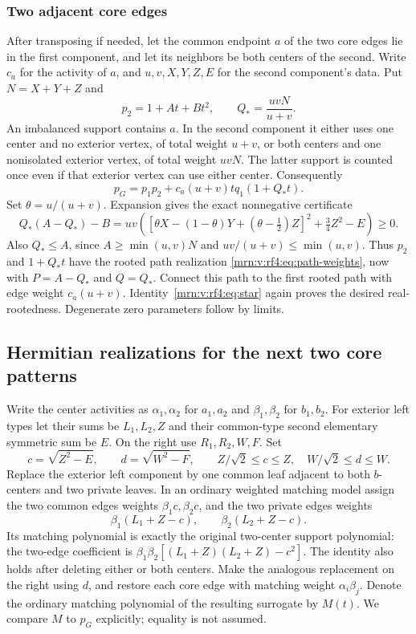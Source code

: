 \documentclass[11pt,a4paper]{article}
\theoremstyle{remark}\newtheorem{remark}[theorem]{Remark}
\begin{document}
\subsubsection{Two adjacent core edges}
After transposing if needed, let the common endpoint $a$ of the two core edges lie in the first component, and let its neighbors be both centers of the second. Write $c_a$ for the activity of $a$, and $u,v,X,Y,Z,E$ for the second component's data. Put $N=X+Y+Z$ and
\[
p_2=1+At+Bt^2,\qquad Q_* =\frac{uvN}{u+v}.
\]
An imbalanced support contains $a$. In the second component it either uses one center and no exterior vertex, of total weight $u+v$, or both centers and one nonisolated exterior vertex, of total weight $uvN$. The latter support is counted once even if that exterior vertex can use either center. Consequently
\begin{equation}\label{mrn:v:rf4:eq:star}
p_G=p_1p_2+c_a(u+v)tq_1(1+Q_*t).
\end{equation}
Set $\theta=u/(u+v)$. Expansion gives the exact nonnegative certificate
\begin{equation}\label{mrn:v:rf4:eq:star-margin}
Q_*(A-Q_*)-B
=uv\left(\left[\theta X-(1-\theta)Y+(\theta-\tfrac12)Z\right]^2
+\tfrac34Z^2-E\right)\ge0.
\end{equation}
Also $Q_*\le A$, since $A\ge\min(u,v)N$ and $uv/(u+v)\le\min(u,v)$. Thus $p_2$ and $1+Q_*t$ have the rooted path realization \eqref{mrn:v:rf4:eq:path-weights}, now with $P=A-Q_*$ and $Q=Q_*$. Connect this path to the first rooted path with edge weight $c_a(u+v)$. Identity~\eqref{mrn:v:rf4:eq:star} again proves the desired real-rootedness. Degenerate zero parameters follow by limits.

\subsection{Hermitian realizations for the next two core patterns}\label{mrn:v:rf4:sec:hermitian}

Write the center activities as $\alpha_1,\alpha_2$ for $a_1,a_2$ and $\beta_1,\beta_2$ for $b_1,b_2$. For exterior left types let their sums be $L_1,L_2,Z$ and their common-type second elementary symmetric sum be $E$. On the right use $R_1,R_2,W,F$. Set
\[
c=\sqrt{Z^2-E},\qquad d=\sqrt{W^2-F},\qquad
Z/\sqrt2\le c\le Z,\quad W/\sqrt2\le d\le W.
\]
Replace the exterior left component by one common leaf adjacent to both $b$-centers and two private leaves. In an ordinary weighted matching model assign the two common edges weights $\beta_1c,\beta_2c$, and the two private edges weights
\[
\beta_1(L_1+Z-c),\qquad\beta_2(L_2+Z-c).
\]
Its matching polynomial is exactly the original two-center support polynomial: the two-edge coefficient is
$\beta_1\beta_2[(L_1+Z)(L_2+Z)-c^2]$.
The identity also holds after deleting either or both centers. Make the analogous replacement on the right using $d$, and restore each core edge with matching weight $\alpha_i\beta_j$. Denote the ordinary matching polynomial of the resulting surrogate by $M(t)$. We compare $M$ to $p_G$ explicitly; equality is not assumed.
\end{document}
